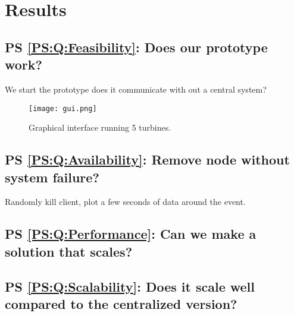 
\chapter{Results}

\section{PS \ref{PS:Q:Feasibility}: Does our prototype work?}
We start the prototype does it communicate with out a central system?

\begin{figure}
	\centering
	\texttt{[image: gui.png]} 
	\caption[Graphical interface running 5 turbines]{
		\label{fig:publishSubscribe} 
		\footnotesize{%
			Graphical interface running 5 turbines.
		}
	}
\end{figure}


\section{PS \ref{PS:Q:Availability}: Remove node without system failure?}
Randomly kill client, plot a few seconds of data around the event.

\section{PS \ref{PS:Q:Performance}: Can we make a solution that scales?}




\section{PS \ref{PS:Q:Scalability}: Does it scale well compared to the centralized version?}




